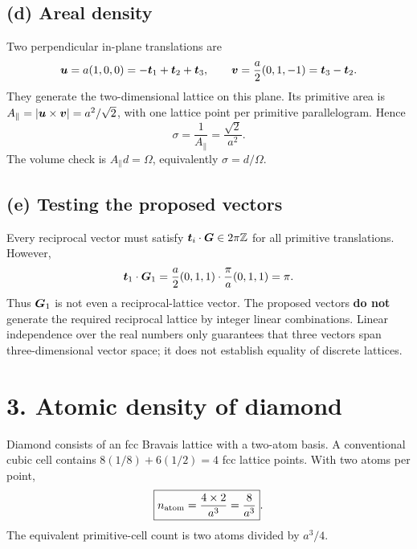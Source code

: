 \subsection*{(d) Areal density}
Two perpendicular in-plane translations are
\[
\boldsymbol{u}=a(1,0,0)=-\boldsymbol{t}_1+\boldsymbol{t}_2+\boldsymbol{t}_3,\qquad
\boldsymbol{v}=\frac a2(0,1,-1)=\boldsymbol{t}_3-\boldsymbol{t}_2.
\]
They generate the two-dimensional lattice on this plane. Its primitive area is
$A_{\parallel}=|\boldsymbol{u}\times\boldsymbol{v}|=a^2/\sqrt2$, with one lattice point per primitive parallelogram. Hence
\[
\boxed{\sigma=\frac1{A_{\parallel}}=\frac{\sqrt2}{a^2}}.
\]
The volume check is $A_{\parallel}d=\Omega$, equivalently $\sigma=d/\Omega$.
\begin{center}
\end{center}

\subsection*{(e) Testing the proposed vectors}
Every reciprocal vector must satisfy
$\boldsymbol{t}_i\cdot\boldsymbol{G}\in2\pi\mathbb Z$ for all primitive translations. However,
\[
\boldsymbol{t}_1\cdot\boldsymbol{G}_1
=\frac a2(0,1,1)\cdot\frac\pi a(0,1,1)=\pi.
\]
Thus $\boldsymbol{G}_1$ is not even a reciprocal-lattice vector. The proposed vectors \textbf{do not} generate the required reciprocal lattice by integer linear combinations. Linear independence over the real numbers only guarantees that three vectors span three-dimensional vector space; it does not establish equality of discrete lattices.

\section*{3. Atomic density of diamond}
Diamond consists of an fcc Bravais lattice with a two-atom basis. A conventional cubic cell contains
$8(1/8)+6(1/2)=4$ fcc lattice points. With two atoms per point,
\[
\boxed{n_{\rm atom}=\frac{4\times2}{a^3}=\frac8{a^3}}.
\]
The equivalent primitive-cell count is two atoms divided by $a^3/4$.

